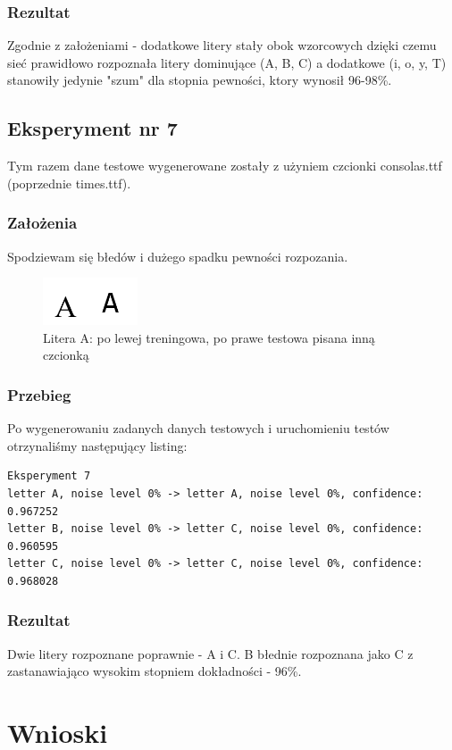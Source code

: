 \documentclass[12pt]{article}
\begin{document}
\subsubsection{Rezultat}
Zgodnie z założeniami - dodatkowe litery stały obok wzorcowych dzięki czemu sieć prawidłowo rozpoznała litery dominujące (A, B, C) a dodatkowe (i, o, y, T) stanowiły jedynie "szum" dla stopnia pewności, ktory wynosił 96-98\%.\\

\subsection{Eksperyment nr 7}
Tym razem dane testowe wygenerowane zostały z użyniem czcionki consolas.ttf (poprzednie times.ttf).
\subsubsection{Założenia}
Spodziewam się błedów i dużego spadku pewności rozpozania.
\begin{figure}[h]
    \centering
    \includegraphics[width=0.25\textwidth]{A_diff.png}
    \caption{Litera A: po lewej treningowa, po prawe testowa pisana inną czcionką}
    \label{fig:A_diff}
\end{figure}
\subsubsection{Przebieg}
Po wygenerowaniu zadanych danych testowych i uruchomieniu testów otrzynaliśmy następujący listing:
\begin{verbatim}
Eksperyment 7
letter A, noise level 0% -> letter A, noise level 0%, confidence: 0.967252
letter B, noise level 0% -> letter C, noise level 0%, confidence: 0.960595
letter C, noise level 0% -> letter C, noise level 0%, confidence: 0.968028
\end{verbatim}
\subsubsection{Rezultat}
Dwie litery rozpoznane poprawnie - A i C. B błednie rozpoznana jako C z zastanawiająco wysokim stopniem dokładności - 96\%.
\section{Wnioski}
\end{document}

